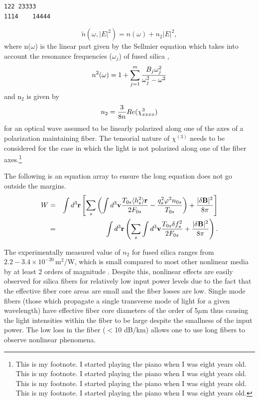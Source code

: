 \begin{verbatim}
122 23333
1114    14444
\end{verbatim}

\begin{equation}
\tilde{n}(\omega,|E|^2) = n(\omega)+n_2|E|^2 ,
\end{equation}
where n($\omega$) is the linear part given by the Sellmier
equation which
takes into account the resonance frequencies ($\omega_j$) of fused
silica \cite{Agrawal1,Marcuse},
\begin{equation}
n^2(\omega) = 1 + \sum_{j=1}^m {B_j\omega^2_j \over \omega^2_j - \omega^2}
\end{equation}
and n$_2$ is given by
\begin{equation}
n_2 = {3 \over 8n}Re(\chi_{xxxx}^3)
\end{equation}
for an optical wave assumed to be linearly polarized along one of the
axes of a polarization maintaining fiber. The tensorial nature of $\chi^{(3)}$ needs to be
considered for the case in which the light is not polarized along one of
the fiber axes.\footnote{This is my footnote.  I started playing the piano when I was eight years old.  This is my footnote.  I started playing the piano when I was eight years old.  This is my footnote.  I started playing the piano when I was eight years old.  This is my footnote.  I started playing the piano when I was eight years old.}

The following is an equation array to ensure the long equation does not go outside the margins.
\begin{eqnarray}
W & = & \int d^3{\bf r} \left[ \sum_s \left( \int d^3{\bf v} {T_{0s} \langle h^2_s \rangle {\bf r} \over 2F_{0s}} - {q^2_s\varphi^2 n_{0s} \over T_{0s}} \right) + {|\delta {\bf B}|^2 \over 8 \pi} \right] \nonumber \\
& = & \int d^3{\bf r} \left( \sum_s \int d^3{\bf v} {T_{0s}\delta f^2_s \over 2F_{0s}} + {|\delta {\bf B}|^2 \over 8\pi} \right) .
\end{eqnarray}

The experimentally measured value of $n_{2}$ for fused silica ranges from $2.2 - 3.4 \times
10^{-20}$\,m$^2$/W, which is small compared to most other nonlinear media by
at least 2 orders of magnitude \cite{Agrawal1}. Despite this, nonlinear effects are
easily observed for silica fibers for relatively low input power levels due
to the fact that the effective fiber core areas are small and the fiber losses are low.
Single mode fibers (those which propagate a single transverse mode of light for a given
wavelength) have effective fiber core diameters of the order of 5$\mu$m thus causing
the light intensities within the fiber to be large despite the smallness of the input
power. The low loss in the fiber ($<$10 dB/km) allows one to use long fibers to observe
nonlinear phenomena.

